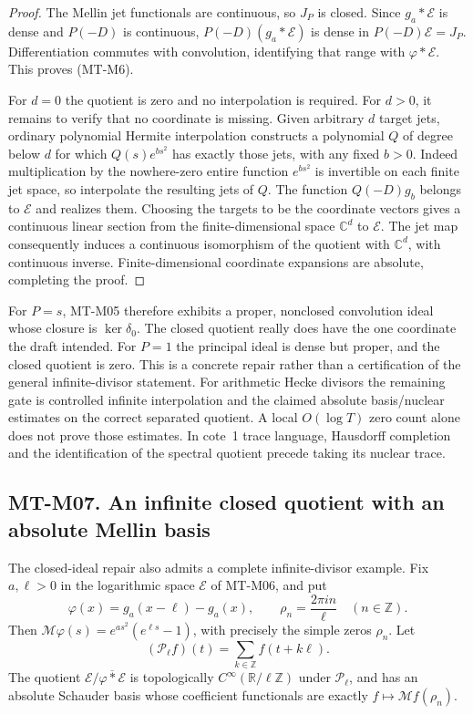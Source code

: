 \begin{proof}
The Mellin jet functionals are continuous, so $J_P$ is closed.
Since $g_a*\mathcal E$ is dense and $P(-D)$ is continuous,
$P(-D)(g_a*\mathcal E)$ is dense in $P(-D)\mathcal E=J_P$.
Differentiation commutes with convolution, identifying that range
with $\varphi*\mathcal E$. This proves (MT-M6).

For $d=0$ the quotient is zero and no interpolation is required.
For $d>0$, it remains to verify that no coordinate is missing. Given arbitrary
$d$ target jets, ordinary polynomial Hermite interpolation constructs
a polynomial $Q$ of degree below $d$ for which
$Q(s)e^{bs^2}$ has exactly those jets, with any fixed $b>0$.
Indeed multiplication by the nowhere-zero entire function $e^{bs^2}$
is invertible on each finite jet space, so interpolate the resulting
jets of $Q$. The function $Q(-D)g_b$ belongs to $\mathcal E$ and
realizes them. Choosing the targets to be the coordinate vectors
gives a continuous linear section from the finite-dimensional space
$\mathbb C^d$ to $\mathcal E$. The jet map consequently induces
a continuous isomorphism of the quotient with $\mathbb C^d$,
with continuous inverse. Finite-dimensional coordinate expansions are
absolute, completing the proof.
\end{proof}

For $P=s$, MT-M05 therefore exhibits a proper, nonclosed convolution
ideal whose closure is $\ker\delta_0$. The closed quotient really
does have the one coordinate the draft intended. For $P=1$ the
principal ideal is dense but proper, and the closed quotient is zero.
This is a concrete repair rather than a certification of the general
infinite-divisor statement. For arithmetic Hecke divisors the remaining
gate is controlled infinite interpolation and the claimed absolute
basis/nuclear estimates on the correct separated quotient. A local
$O(\log T)$ zero count alone does not prove those estimates.
In cote~1 trace language, Hausdorff completion and the identification
of the spectral quotient precede taking its nuclear trace.

\subsection*{MT-M07. An infinite closed quotient with an absolute Mellin basis}
The closed-ideal repair also admits a complete infinite-divisor example.
Fix $a,\ell>0$ in the logarithmic space $\mathcal E$ of MT-M06, and put
\[
 \varphi(x)=g_a(x-\ell)-g_a(x),\qquad
 \rho_n=\frac{2\pi i n}{\ell}\quad(n\in\mathbb Z).
\]
Then $\mathcal M\varphi(s)=e^{as^2}(e^{\ell s}-1)$, with precisely
the simple zeros $\rho_n$. Let
\[
 (\mathcal P_\ell f)(t)=\sum_{k\in\mathbb Z}f(t+k\ell).
\]
The quotient $\mathcal E/\overline{\varphi*\mathcal E}$ is
topologically $C^\infty(\mathbb R/\ell\mathbb Z)$ under
$\mathcal P_\ell$, and has an absolute Schauder basis whose coefficient
functionals are exactly $f\mapsto\mathcal Mf(\rho_n)$.

